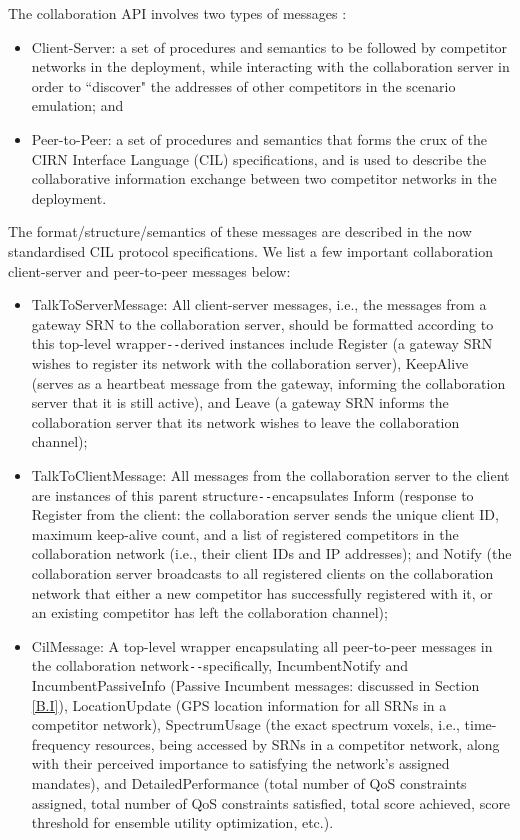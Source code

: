 The collaboration API involves two types of messages \cite{DARPA:SC2collaborationprotocol}:
\begin{itemize}
    \item Client-Server: a set of procedures and semantics to be followed by competitor networks in the deployment, while interacting with the collaboration server in order to ``discover" the addresses of other competitors in the scenario emulation; and
    \item Peer-to-Peer: a set of procedures and semantics that forms the crux of the CIRN Interface Language (CIL) specifications, and is used to describe the collaborative information exchange between two competitor networks in the deployment.
\end{itemize}
The format/structure/semantics of these messages are described in the now standardised CIL protocol specifications. We list a few important collaboration client-server and peer-to-peer messages below:
\begin{itemize}
    \item TalkToServerMessage: All client-server messages, i.e., the messages from a gateway SRN to the collaboration server, should be formatted according to this top-level wrapper\texttt{-{}-}derived instances include Register (a gateway SRN wishes to register its network with the collaboration server), KeepAlive (serves as a heartbeat message from the gateway, informing the collaboration server that it is still active), and Leave (a gateway SRN informs the collaboration server that its network wishes to leave the collaboration channel);
    \item TalkToClientMessage: All messages from the collaboration server to the client are instances of this parent structure\texttt{-{}-}encapsulates Inform (response to Register from the client: the collaboration server sends the unique client ID, maximum keep-alive count, and a list of registered competitors in the collaboration network (i.e., their client IDs and IP addresses); and Notify (the collaboration server broadcasts to all registered clients on the collaboration network that either a new competitor has successfully registered with it, or an existing competitor has left the collaboration channel);
    \item CilMessage: A top-level wrapper encapsulating all peer-to-peer messages in the collaboration network\texttt{-{}-}specifically, IncumbentNotify and IncumbentPassiveInfo (Passive Incumbent messages: discussed in Section \ref{B.I}), LocationUpdate (GPS location information for all SRNs in a competitor network), SpectrumUsage (the exact spectrum voxels, i.e., time-frequency resources, being accessed by SRNs in a competitor network, along with their perceived importance to satisfying the network's assigned mandates), and DetailedPerformance (total number of QoS constraints assigned, total number of QoS constraints satisfied, total score achieved, score threshold for ensemble utility optimization, etc.).
\end{itemize}
